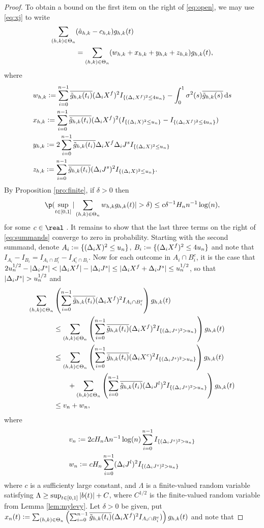 \begin{proof}
     To obtain a bound on the first item on the right of \eqref{eq:open}, we may use \eqref{eq:xj} to write
    \begin{align}
      \sumt &(\ceen{X} - \cee)\ghk(t)   \notag \\&= \sumt (w_{h,k} + x_{h,k} + y_{h,k} + z_{h,k}) \ghk(t),\label{eq:summands} 
    \end{align}
    where 
    \begin{align}
      &w_{h,k} :=  \sumin \btghki  (\dxf)^2 \indxff - \int^{1}_{0} \sigma^2(s) \btghks \D s \notag\\
      &x_{h,k} :=  \sumin \btghki(\dxf)^2 (\indx - \indxff) \notag\\
      &y_{h,k}  := 2 \sumin \btghki\dxf \djt \indx \notag \\
      &z_{h,k} := \sumin \btghki(\djt)^2\indx.
      \label{}
    \end{align}
    By Proposition \eqref{pro:finite}, if $\delta > 0$ then \begin{align}  \p(\sup_{t \in [0,1]}\vert \sumt w_{h,k} \ghk(t) \vert > \delta) \le  c \delta^{-1} H_nn^{-1} \log(n), \label{eq:w} \end{align} for some $c \in \real$ .  It remains to show that the last three terms on the right of \eqref{eq:summands} converge to zero in probability. Starting with the second summand, denote $A_i := \{(\dx)^2 \le u_n\}$,  $B_i   := \{(\dxf)^2 \le 4 u_n\}$ and note that $I_{A_i} - I_{B_i} = I_{A_i \cap B_i^c} - I_{A^c_i\cap B_i}$. Now for each outcome in $A_i \cap B_i^c$, it is the case that $2 u_n^{1/2} - \vert \djt \vert < \vert \dxf \vert - \vert \djt \vert \le \vert \dxf + \djt  \vert \le u_n^{1/2}$, so that $\vert \djt \vert > u_n^{1/2}$ and 
    \begin{align}
      \sumt &  \left( \sumin \btghki(\dxf)^2 I_{A_i \cap B_i^c}\right) \ghk(t) \notag \\ 
       & \le \sumt \left( \sumin \btghki(\dxf)^2 I_{\{(\djt)^2 > u_n\}} \right) \ghk(t) \notag\\
       & \le \sumt \left( \sumin \btghki(\dxc)^2 I_{\{(\djt)^2 > u_n\}}\right) \ghk(t)  \notag \\ 
       &\qquad+ \sumt \left( \sumin \btghki(\djl)^2 I_{\{(\djt)^2 > u_n\}}\right) \ghk(t)\notag\\
       & \le  v_n + w_n, 
      \label{eq:longineq}
    \end{align}
    where \begin{align} &v_n :=  2c H_n \Lambda n^{-1} \log(n) \sumin I_{\{(\djt)^2 > u_n\}} \notag \\ & w_n: = c H_n \sumin  (\djl)^2 I_{\{(\djt)^2 > u_n\}}\notag \end{align}  where $c$ is a sufficienty large constant, and $\Lambda$ is a finite-valued random variable satisfying  $\Lambda \ge  \sup_{t \in \domain} \vert b(t)\vert  + C $, where $C^{1/2}$ is the finite-valued random variable from Lemma \ref{lem:mylevy}.  Let  $\delta > 0$ be given, put  $x_n(t)  :=  \sumt\left(\sumin  \btghki(\dxf)^2 I_{A_i \cap B_i^c})\right)\ghk(t)$  and note that 

\end{proof}
